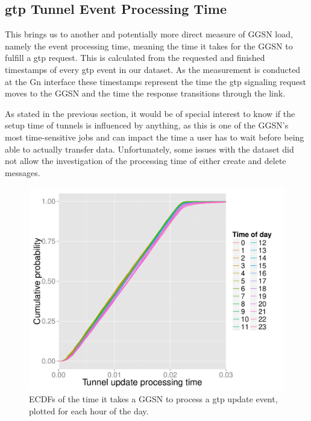 \subsection{\texorpdfstring{\acrshort{gtp}}{GTP} Tunnel Event Processing Time}

This brings us to another and potentially more direct measure of \gls{GGSN} load, namely the event processing time, meaning the time it takes for the \gls{GGSN} to fulfill a \gls{gtp} request. This is calculated from the requested and finished timestamps of every \gls{gtp} event in our dataset. As the measurement is conducted at the Gn interface these timestamps represent the time the \gls{gtp} signaling request moves to the \gls{GGSN} and the time the response transitions through the link.

As stated in the previous section, it would be of special interest to know if the setup time of tunnels is influenced by anything, as this is one of the \gls{GGSN}'s most time-sensitive jobs and can impact the time a user has to wait before being able to actually transfer data. Unfortunately, some issues with the dataset did not allow the investigation of the processing time of either create and delete messages.

\begin{figure}[htb]
	\centering
	\includegraphics[width=1.0\textwidth]{images/R-update-time-cdfs.pdf}
	\caption{\glspl{ECDF} of the time it takes a \gls{GGSN} to process a \gls{gtp} update event, plotted for each hour of the day.}
	\label{c4:fig:update-time}
\end{figure}


